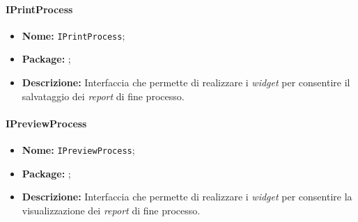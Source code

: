 \paragraph{IPrintProcess}
\begin{itemize}
\item \textbf{Nome:} \texttt{IPrintProcess};
\item \textbf{Package:} \texttt{\iViewUser{}};
\item \textbf{Descrizione:} Interfaccia che permette di realizzare i \textit{widget} per consentire il salvataggio dei \textit{report} di fine processo.
\end{itemize}

\paragraph{IPreviewProcess}
\begin{itemize}
\item \textbf{Nome:} \texttt{IPreviewProcess};
\item \textbf{Package:} \texttt{\iViewUser{}};
\item \textbf{Descrizione:} Interfaccia che permette di realizzare i \textit{widget} per consentire la visualizzazione dei \textit{report} di fine processo.
\end{itemize}